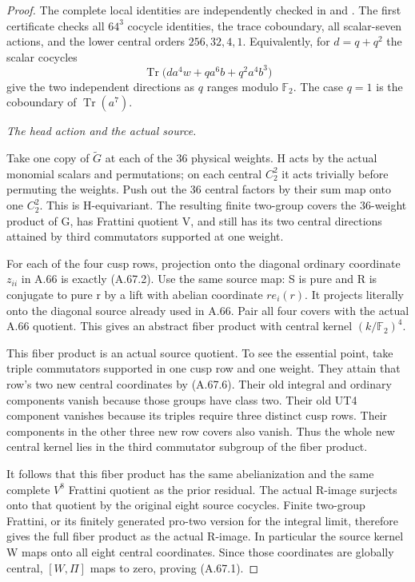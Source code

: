 \begin{proof}
The complete local identities are independently checked in
 and
.
The first certificate checks all \(64^3\) cocycle identities,
the trace coboundary, all scalar-seven actions, and the lower
central orders \(256,32,4,1\). Equivalently, for
\(d=q+q^2\) the scalar cocycles
\[
 \operatorname{Tr}\bigl(d a^4w+q a^6b+q^2a^4b^3\bigr)
 \tag{A.67.8}
\]
give the two independent directions as \(q\) ranges modulo
\(\mathbb F_2\). The case \(q=1\) is the coboundary of
\(\operatorname{Tr}(a^7)\).

\emph{The head action and the actual source.}\par
Take one copy of \(\widetilde G\) at each of the 36 physical
weights. H acts by the actual monomial scalars and permutations;
on each central \(C_2^2\) it acts trivially before permuting
the weights. Push out the 36 central factors by their sum map
onto one \(C_2^2\). This is H-equivariant. The resulting finite
two-group covers the 36-weight product of G, has Frattini
quotient V, and still has its two central directions attained
by third commutators supported at one weight.

For each of the four cusp rows, projection onto the diagonal
ordinary coordinate \(z_{ii}\) in A.66 is exactly (A.67.2).
Use the same source map: S is pure and R is conjugate to pure r
by a lift with abelian coordinate \(r e_i(r)\). It projects
literally onto the diagonal source already used in A.66.
Pair all four covers with the actual A.66 quotient. This gives
an abstract fiber product with central kernel
\((k/\mathbb F_2)^4\).

This fiber product is an actual source quotient. To see the
essential point, take triple commutators supported in one cusp
row and one weight. They attain that row's two new central
coordinates by (A.67.6). Their old integral and ordinary
components vanish because those groups have class two. Their
old UT4 component vanishes because its triples require three
distinct cusp rows. Their components in the other three new
row covers also vanish. Thus the whole new central kernel lies
in the third commutator subgroup of the fiber product.

It follows that this fiber product has the same abelianization
and the same complete \(V^8\) Frattini quotient as the prior
residual. The actual R-image surjects onto that quotient by the
original eight source cocycles. Finite two-group Frattini, or
its finitely generated pro-two version for the integral limit,
therefore gives the full fiber product as the actual R-image.
In particular the source kernel W maps onto all eight central
coordinates. Since those coordinates are globally central,
\([W,\Pi]\) maps to zero, proving (A.67.1).


\end{proof}
